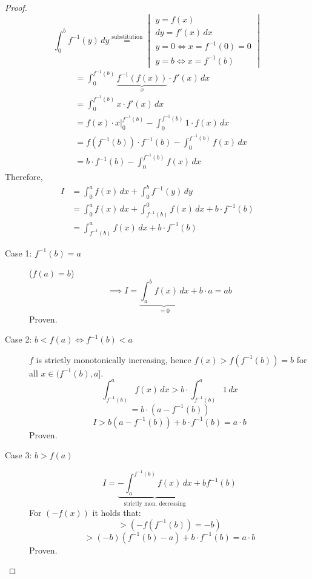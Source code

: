 \documentclass[a4paper,landscape,twocolumn]{article}
\theoremstyle{definition}
\begin{document}
\begin{proof}
  \[ \int_0^b f^{-1}(y) \, dy \overset{\text{substitution}}{=}
    \begin{vmatrix}
      y = f(x) \\
      dy = f'(x) \, dx \\
      y = 0 \Leftrightarrow x = f^{-1}(0) = 0 \\
      y = b \Leftrightarrow x = f^{-1}(b)
    \end{vmatrix}
  \]
  \begin{align*}
    &= \int_0^{f^{-1}(b)} \underbrace{f^{-1}(f(x))}_{x} \cdot f'(x) \, dx \\
    &= \int_0^{f^{-1}(b)} x \cdot f'(x) \, dx \\
    &= \left. f(x) \cdot x \right|_0^{f^{-1}(b)} - \int_0^{f^{-1}(b)} 1 \cdot f(x) \, dx \\
    &= f(f^{-1}(b)) \cdot f^{-1}(b) - \int_0^{f^{-1}(b)} f(x) \, dx \\
    &= b \cdot f^{-1}(b) - \int_0^{f^{-1}(b)} f(x) \, dx
  \end{align*}
  Therefore,
  \begin{align*}
    I
    &= \int_0^a f(x) \, dx + \int_0^b f^{-1}(y) \, dy \\
    &= \int_0^a f(x) \, dx + \int_{f^{-1}(b)}^0 f(x) \, dx + b \cdot f^{-1}(b) \\
    &= \int_{f^{-1}(b)}^a f(x) \, dx + b \cdot f^{-1}(b)
  \end{align*}

  \begin{description}
    \item[Case 1: $f^{-1}(b) = a$] ($f(a) = b$)
      \[ \implies I = \underbrace{\int_a^b f(x) \, dx}_{=0} + b \cdot a = ab \]
      Proven.
    \item[Case 2: $b < f(a) \Leftrightarrow f^{-1}(b) < a$]
      $f$ is strictly monotonically increasing, hence $f(x) > f(f^{-1}(b)) = b$
      for all $x \in (f^{-1}(b), a]$.
      \[ \int_{f^{-1}(b)}^a f(x) \, dx > b \cdot \int_{f^{-1}(b)}^a 1 \, dx \]
      \[ = b \cdot \left(a - f^{-1}(b)\right) \]
      \[ I > b \left(a - f^{-1}(b)\right) + b \cdot f^{-1}(b) = a \cdot b \]
      Proven.
    \item[Case 3: $b > f(a)$]
      \[ I = \underbrace{- \int_a^{f^{-1}(b)} f(x) \, dx}_{\text{strictly mon. decreasing}} + b f^{-1}(b) \]
      For $(-f(x))$ it holds that:
      \[ > (-f(f^{-1}(b)) = -b) \]
      \[ > (-b) \left(f^{-1}(b) - a\right) + b \cdot f^{-1}(b) = a \cdot b \]
      Proven.
  \end{description}
\end{proof}
\end{document}
